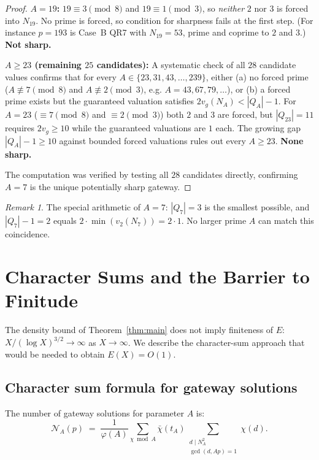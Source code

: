 \documentclass[12pt]{amsart}
\theoremstyle{definition}
\theoremstyle{remark}
\newtheorem{remark}[theorem]{Remark}
\begin{document}
\begin{proof}
\textbf{$A = 19$:}
$19 \equiv 3 \pmod 8$ and $19 \equiv 1 \pmod 3$, so \emph{neither} $2$ nor
$3$ is forced into $N_{19}$. No prime is forced, so condition for
sharpness fails at the first step. (For instance $p = 193$ is Case~B QR7
with $N_{19} = 53$, prime and coprime to $2$ and $3$.)
\textbf{Not sharp.}

\textbf{$A \ge 23$ (remaining $25$ candidates):}
A systematic check of all $28$ candidate values confirms that for every
$A \in \{23, 31, 43, \ldots, 239\}$, either
(a) no forced prime ($A \not\equiv 7 \pmod 8$ and $A \not\equiv 2 \pmod 3$,
e.g. $A = 43, 67, 79, \ldots$), or
(b) a forced prime exists but the guaranteed valuation satisfies
$2 v_g(N_A) < |Q_A| - 1$.
For $A = 23$ ($\equiv 7 \pmod 8$ and $\equiv 2 \pmod 3$) both $2$ and $3$
are forced, but $|Q_{23}| = 11$ requires $2 v_g \ge 10$ while the
guaranteed valuations are $1$ each. The growing gap $|Q_A| - 1 \ge 10$
against bounded forced valuations rules out every $A \ge 23$.
\textbf{None sharp.}

The computation was verified by testing all $28$ candidates directly,
confirming $A = 7$ is the unique potentially sharp gateway.
\end{proof}

\begin{remark}
The special arithmetic of $A = 7$:
$|Q_7| = 3$ is the smallest possible, and $|Q_7| - 1 = 2$ equals
$2 \cdot \min(v_2(N_7)) = 2 \cdot 1$.  No larger prime $A$ can match
this coincidence.
\end{remark}

\section{Character Sums and the Barrier to Finitude}\label{sec:charsums}

The density bound of Theorem~\ref{thm:main} does not imply finiteness of $E$:
$X/(\log X)^{3/2} \to \infty$ as $X \to \infty$.
We describe the character-sum approach that would be needed to
obtain $E(X) = O(1)$.

\subsection{Character sum formula for gateway solutions}

The number of gateway solutions for parameter $A$ is:
\begin{equation}\label{eq:N-formula}
  \mathcal{N}_A(p) \;=\;
  \frac{1}{\varphi(A)} \sum_{\chi \bmod A} \bar\chi(t_A)
  \sum_{\substack{d \mid N_A^2 \\ \gcd(d,Ap)=1}} \chi(d).
\end{equation}
\end{document}

